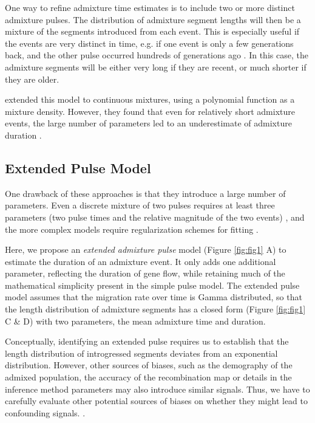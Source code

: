 \documentclass[11pt]{article}
\begin{document}

One way to refine admixture time estimates is to include two or more distinct admixture pulses. The distribution of admixture segment lengths will then be a mixture of the segments introduced from each event. This is especially useful if the events are very distinct in time, e.g. if one event is only a few generations back, and the other pulse occurred hundreds of generations ago \citep{fu_genome_2014, fu_early_2015}. In this case, the admixture segments will be either very long if they are recent, or much shorter if they are older.

\cite{zhou_modeling_2017} extended this model to continuous mixtures, using a polynomial function as a mixture density. However, they found that even for relatively short admixture events, the large number of parameters led to an underestimate of admixture duration \citep{zhou_inference_2017}. 
\subsection{Extended Pulse Model}
One drawback of these approaches is that they introduce a large number of parameters. Even a discrete mixture of two pulses requires at least three parameters (two pulse times and the relative magnitude of the two events) \citep{pickrell_ancient_2014}, and the more complex models require regularization schemes for fitting \citep{zhou_inference_2017, ralph_geography_2013}.

Here, we propose an \emph{extended admixture pulse} model (Figure \ref{fig:fig1} A) to estimate the duration of an admixture event. It only adds one additional parameter, reflecting the duration of gene flow, while retaining much of the mathematical simplicity present in the simple pulse model. 
The extended pulse model assumes that the migration rate over time is Gamma distributed, so that the length distribution of admixture segments has a closed form (Figure \ref{fig:fig1} C \& D) with two parameters, the mean admixture time and duration.

Conceptually, identifying an extended pulse requires us to establish that the length distribution of introgressed segments deviates from an exponential distribution. However, other sources of biases, such as the demography of the admixed population, the accuracy of the recombination map or details in the inference method parameters may also introduce similar signals. Thus, we have to carefully evaluate other potential sources of biases on whether they might lead to confounding signals. \citep{sankararaman_date_2012,fu_genome_2014,moorjani_genetic_2016}. 
\end{document}
